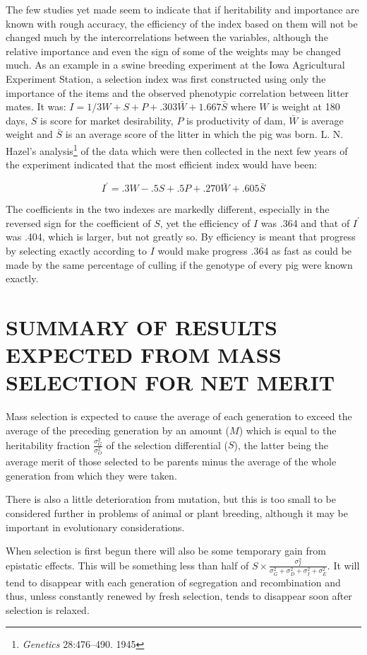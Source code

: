 The few studies yet made seem to indicate that if heritability and
importance are known with rough accuracy, the efficiency of the index
based on them will not be changed much by the intercorrelations
between the variables, although the relative importance and even the
sign of some of the weights may be changed much. As an example in a
swine breeding experiment at the Iowa Agricultural Experiment Station,
a selection index was first constructed using only the importance
of the items and the observed phenotypic correlation between litter
mates. It was: $I = 1/3W + S + P + .303\bar{W} + 1.667\bar{S}$ where
$W$ is weight at 180 days, $S$ is score for market desirability, $P$
is productivity of dam, $\bar{W}$ is average weight and $\bar{S}$ is
an average score of the litter in which the pig was born. L. N. Hazel's
analysis\footnote{\textit{Genetics} 28:476--490. 1945} of the data which
were then collected in the next few years of the experiment indicated
that the most efficient index would have been:

\[I^\prime = .3W - .5S + .5P + .270\bar{W} + .605\bar{S}\]

The coefficients in the two indexes are markedly different, especially in
the reversed sign for the coefficient of $S$, yet the efficiency of $I$ was .364
and that of $I^\prime$ was .404, which is larger, but not greatly so. By efficiency
is meant that progress by selecting exactly according to $I$ would make
progress .364 as fast as could be made by the same percentage of culling
if the genotype of every pig were known exactly.

\section*{SUMMARY OF RESULTS EXPECTED FROM MASS SELECTION FOR NET MERIT}

Mass selection is expected to cause the average of each generation
to exceed the average of the preceding generation by an amount ($M$)
which is equal to the heritability fraction $\frac{\sigma_G^2}{\sigma_O^2}$
of the selection differential ($S$), the latter being the average
merit of those selected to be parents minus the average of the whole generation
from which they were taken.

There is also a little deterioration from mutation, but this is too
small to be considered further in problems of animal or plant breeding,
although it may be important in evolutionary considerations.

When selection is first begun there will also be some temporary gain
from epistatic effects. This will be something less than half of
$S \times \frac{\sigma_I^2}{\sigma_G^2 + \sigma_D^2 + \sigma_I^2 + \sigma_E^2}$.
It will tend to disappear with each generation of segregation and recombination
and thus, unless constantly renewed by fresh selection, tends to disappear soon
after selection is relaxed.

